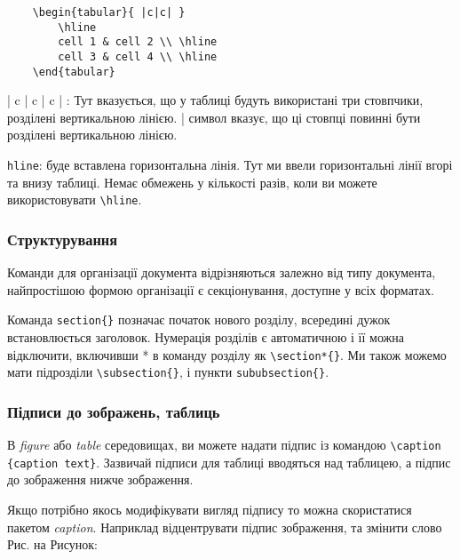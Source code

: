 \begin{lstlisting}
	\begin{tabular}{ |c|c| }
		\hline 
		cell 1 & cell 2 \\ \hline
		cell 3 & cell 4 \\ \hline
	\end{tabular}
\end{lstlisting}


{| c | c | c | }: Тут вказується, що у таблиці будуть використані три стовпчики, розділені вертикальною лінією. | символ вказує, що ці стовпці повинні бути розділені вертикальною лінією. 

\verb|hline|: буде вставлена горизонтальна лінія. Тут ми ввели горизонтальні лінії вгорі та внизу таблиці. Немає обмежень у кількості разів, коли ви можете використовувати \verb|\hline|.

\subsubsection{Структурування}

Команди для організації документа відрізняються залежно від типу документа, найпростішою формою організації є секціонування, доступне у всіх форматах.

Команда \verb|section{}| позначає початок нового розділу, всередині дужок встановлюється заголовок. Нумерація розділів є автоматичною і її можна відключити, включивши * в команду розділу як \verb|\section*{}|. Ми також можемо мати підрозділи \verb|\subsection{}|, і пункти  \verb|sububsection{}|. 

\subsubsection{Підписи до зображень, таблиць}\label{capt}

В \textit{figure} або \textit{table}
середовищах, ви можете надати підпис із командою \verb|\caption {caption text}|. Зазвичай підписи для таблиці вводяться над таблицею, а підпис до зображення
нижче зображення.

Якщо потрібно якось модифікувати вигляд підпису то можна скористатися пакетом \textit{caption}. Наприклад відцентрувати підпис зображення, та змінити слово Рис. на Рисунок:

